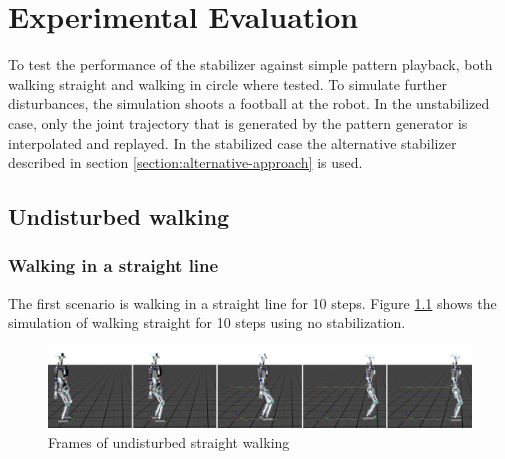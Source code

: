 \documentclass[english,ngerman]{KITreprt}
\begin{document}
\chapter{Experimental Evaluation}\label{experimental-evaluation}

To test the performance of the stabilizer against simple pattern
playback, both walking straight and walking in circle where tested. To
simulate further disturbances, the simulation shoots a football at the
robot. In the unstabilized case, only the joint trajectory that is
generated by the pattern generator is interpolated and replayed. In the
stabilized case the alternative stabilizer described in section
\ref{section:alternative-approach} is used.

\section{Undisturbed walking}\label{undisturbed-walking}

\subsection{Walking in a straight
line}\label{walking-in-a-straight-line}

The first scenario is walking in a straight line for 10 steps. Figure
\ref{img:player-undisturbed-straight-thumbs} shows the simulation of
walking straight for 10 steps using no stabilization.

\begin{figure}[H]
\vspace*{-1em}
\includegraphics[width=\textwidth]{images/undisturbed_straight_thumbs.png}
\caption{Frames of undisturbed straight walking}
\label{img:player-undisturbed-straight-thumbs}
\end{figure}
\end{document}
